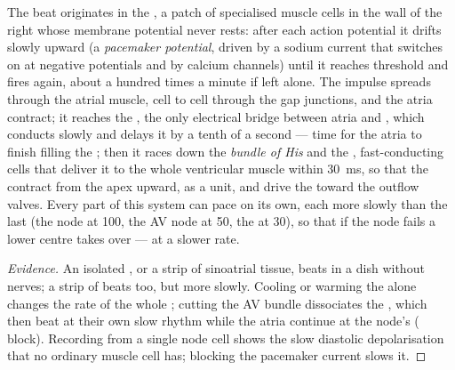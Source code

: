 \begin{proposition}\label{prop:b2:heart:conduction}
The beat originates in the \emph{}, a patch of
specialised muscle cells in the wall of the right  whose
membrane potential never rests: after each action potential it
drifts slowly upward (a \emph{pacemaker potential}, driven by a
sodium current that switches on at negative potentials and by
calcium channels) until it reaches threshold and fires again, about
a hundred times a minute if left alone. The impulse spreads through
the atrial muscle, cell to cell through the gap junctions, and the
atria contract; it reaches the \emph{}, the
only electrical bridge between atria and , which conducts
slowly and delays it by a tenth of a second --- time for the atria
to finish filling the ; then it races down the
\emph{bundle of His} and the \emph{}, fast-conducting
cells that deliver it to the whole ventricular muscle within
\qty{30}{ms}, so that the  contract from the apex upward,
as a unit, and drive the  toward the outflow valves. Every
part of this system can pace on its own, each more slowly than the
last (the node at 100, the AV node at 50, the  at
30), so that if the node fails a lower centre takes over --- at a
slower rate.
\end{proposition}
\begin{proof}[Evidence]
An isolated , or a strip of sinoatrial tissue, beats in a dish
without nerves; a strip of  beats too, but more slowly.
Cooling or warming the  alone changes the rate of
the whole ; cutting the AV bundle dissociates the ,
which then beat at their own slow rhythm while the atria continue
at the node's ( block). Recording from a single node cell
shows the slow diastolic depolarisation that no ordinary muscle
cell has; blocking the pacemaker current slows it.
\end{proof}

